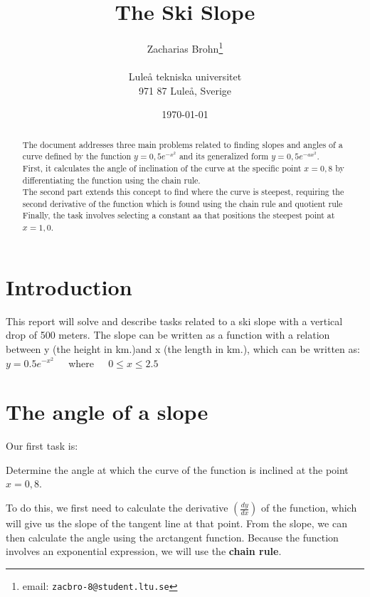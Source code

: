 \documentclass[a4paper,12pt]{article}
\title{The Ski Slope}
\author{Zacharias Brohn\thanks{email:
    \texttt{zacbro-8@student.ltu.se}}\\  
    ~ \\
    Luleå tekniska universitet \\ 
    971 87 Luleå, Sverige}
\date{\today}
\begin{document}
\linenumbers %

\maketitle

\begin{abstract}
    The document addresses three main problems related to finding slopes and 
    angles of a curve defined by the function $y = 0,5e^{-x^2}$ and its 
    generalized form $y = 0,5e^{-ax^2}$. \\
  
    First, it calculates the angle of inclination of the curve at the specific 
    point $x = 0,8$ by differentiating the function using the chain rule. \\

    The second part extends this concept to find where the curve is steepest, 
    requiring the second derivative of the function which is found using the 
    chain rule and quotient rule \\

    Finally, the task involves selecting a constant aa that positions the 
    steepest point at $x = 1,0$.
\end{abstract}
%
\section{Introduction}
\label{sec:introduktion}
This report will solve and describe tasks related to a ski slope with a vertical
drop of 500 meters. The slope can be written as a function with a relation 
between y (the height in km.)and x (the length in km.),
which can be written as:\\ %
$y = 0.5e^{-x^2}$ $\>$ $\>$ where $\>$ $\>$ $0 \leq x \leq 2.5$
%
\newpage
\section{The angle of a slope}
\label{sec:uppg1}
Our first task is:\\ %
\begin{addmargin}[1em]{1em}
    Determine the angle at which the curve of the function is inclined at the %
    point $x=0,8$.\\ %
\end{addmargin}
To do this, we first need to calculate the derivative 
$\left(\frac{dy}{dx}\right)$ of the function, which will give us the slope of 
the tangent line at that point. From the slope, we can then calculate the 
angle using the arctangent function. Because the function involves an 
exponential expression, we will use the \textbf{chain rule}.
%
\end{document}
